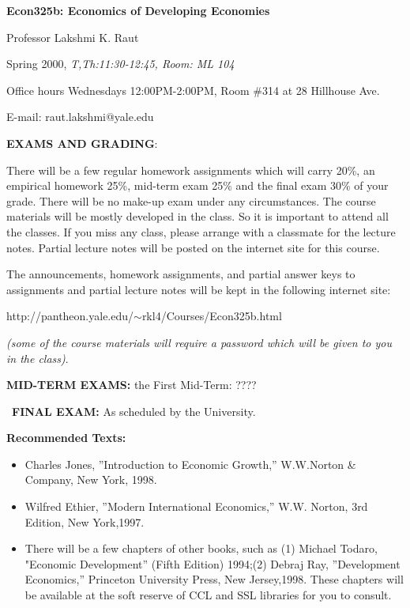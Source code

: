 \documentclass[11pt,pdftex]{article}
\begin{document}
\begin{centering}
{\Large {\bf Econ325b: Economics of Developing Economies }}
\end{centering}
\medskip

\noindent  Professor Lakshmi K. Raut

\noindent Spring 2000, \emph{T,Th:11:30-12:45, Room: ML 104}

\noindent  Office hours Wednesdays 12:00PM-2:00PM, Room \#314 at 28
Hillhouse Ave.

\noindent  E-mail: raut.lakshmi@yale.edu

\noindent \textbf{EXAMS AND GRADING}:

There will be a few regular homework assignments which will carry 20\%, an
empirical homework 25\%, mid-term exam 25\% and the final exam 30\% of your
grade. There will be no make-up exam under any circumstances. The course
materials will be mostly developed in the class. So it is important to
attend all the classes. If you miss any class, please arrange with a
classmate for the lecture notes. Partial lecture notes will be posted on the
internet site for this course.

The announcements, homework assignments, and partial answer keys to
assignments and partial lecture notes will be kept in the following internet
site:

http://pantheon.yale.edu/$\sim $rkl4/Courses/Econ325b.html

\emph{(some of the course materials will require a password which will be
given to you in the class)}.

\noindent \textbf{MID-TERM EXAMS:} the First Mid-Term: ????

\noindent\ \textbf{FINAL EXAM:} As scheduled by the University.

\noindent \textbf{Recommended Texts:}

\begin{itemize}

\item  Charles Jones, ''Introduction to Economic Growth,'' W.W.Norton \&
Company, New York, 1998.

\item  Wilfred Ethier, ''Modern International Economics,'' W.W. Norton, 3rd
Edition, New York,1997.

\item There will be a few chapters of other books, such as (1) Michael Todaro,
"Economic Development'' (Fifth Edition) 1994;(2) Debraj Ray, ''Development
Economics,'' Princeton University Press, New Jersey,1998. These
chapters will be available at the soft reserve of CCL and SSL libraries
for you to consult.

\end{itemize}
\end{document}
